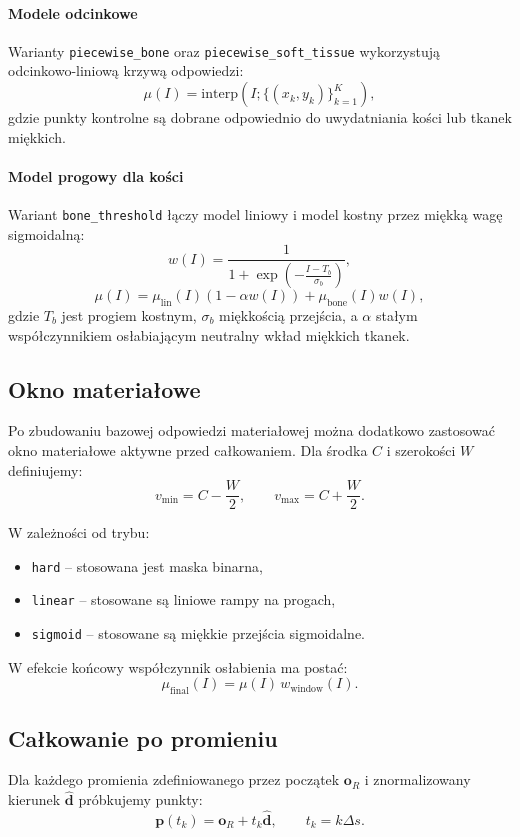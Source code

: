 \documentclass[12pt,a4paper]{article}
\begin{document}
\paragraph{Modele odcinkowe}
Warianty \texttt{piecewise\_bone} oraz \texttt{piecewise\_soft\_tissue}
wykorzystują odcinkowo-liniową krzywą odpowiedzi:
\[
  \mu(I) = \mathrm{interp}(I; \{(x_k, y_k)\}_{k=1}^{K}),
\]
gdzie punkty kontrolne są dobrane odpowiednio do uwydatniania kości lub tkanek
miękkich.

\paragraph{Model progowy dla kości}
Wariant \texttt{bone\_threshold} łączy model liniowy i model kostny przez miękką
wagę sigmoidalną:
\[
  w(I) = \frac{1}{1 + \exp\!\left(-\frac{I - T_b}{\sigma_b}\right)},
\]
\[
  \mu(I) =
  \mu_{\mathrm{lin}}(I)\left(1-\alpha w(I)\right)
  +
  \mu_{\mathrm{bone}}(I) w(I),
\]
gdzie \(T_b\) jest progiem kostnym, \(\sigma_b\) miękkością przejścia, a
\(\alpha\) stałym współczynnikiem osłabiającym neutralny wkład miękkich tkanek.

\subsection{Okno materiałowe}

Po zbudowaniu bazowej odpowiedzi materiałowej można dodatkowo zastosować okno
materiałowe aktywne przed całkowaniem. Dla środka \(C\) i szerokości \(W\) definiujemy:
\[
  v_{\min} = C - \frac{W}{2},
  \qquad
  v_{\max} = C + \frac{W}{2}.
\]

W zależności od trybu:
\begin{itemize}
  \item \texttt{hard} -- stosowana jest maska binarna,
  \item \texttt{linear} -- stosowane są liniowe rampy na progach,
  \item \texttt{sigmoid} -- stosowane są miękkie przejścia sigmoidalne.
\end{itemize}

W efekcie końcowy współczynnik osłabienia ma postać:
\[
  \mu_{\mathrm{final}}(I) = \mu(I)\,w_{\mathrm{window}}(I).
\]

\subsection{Całkowanie po promieniu}

Dla każdego promienia zdefiniowanego przez początek \(\mathbf{o}_R\) i znormalizowany
kierunek \(\hat{\mathbf{d}}\) próbkujemy punkty:
\[
  \mathbf{p}(t_k) = \mathbf{o}_R + t_k\hat{\mathbf{d}},
  \qquad
  t_k = k\Delta s.
\]
\end{document}
